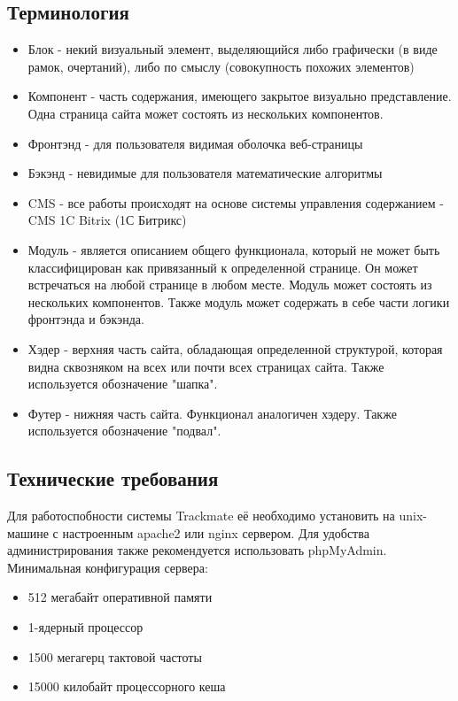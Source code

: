 \documentclass[DIV=calc, paper=a4, fontsize=11pt]{scrartcl} %
\begin{document}
\subsection{Терминология}
        
        \begin{itemize}
        \item Блок - некий визуальный элемент, выделяющийся либо графически (в виде рамок, очертаний), либо по смыслу (совокупность похожих элементов)
        \item Компонент - часть содержания, имеющего закрытое визуально представление. Одна страница сайта может состоять из нескольких компонентов.
        \item Фронтэнд - для пользователя видимая оболочка веб-страницы
        \item Бэкэнд - невидимые для пользователя математические алгоритмы
        \item CMS - все работы происходят на основе системы управления содержанием - CMS 1C Bitrix (1С Битрикс)
        \item Модуль - является описанием общего функционала, который не может быть классифицирован как привязанный к определенной странице. Он может встречаться на любой странице в любом месте. Модуль может состоять из нескольких компонентов. Также модуль может содержать в себе части логики фронтэнда и бэкэнда.
        \item Хэдер - верхняя часть сайта, обладающая определенной структурой, которая видна сквозняком на всех или почти всех страницах сайта. Также используется обозначение "шапка".
        \item Футер - нижняя часть сайта. Функционал аналогичен хэдеру. Также используется обозначение "подвал".
    \end{itemize}
    
\subsection{Технические требования}
Для работоспобности системы Trackmate её необходимо установить на unix-машине с настроенным apache2 или nginx сервером.
Для удобства администрирования также рекомендуется использовать phpMyAdmin.
\\[0.5cm]
Минимальная конфигурация сервера:
\begin{itemize}
	\item 512 мегабайт оперативной памяти
	\item 1-ядерный процессор
	\item 1500 мегагерц тактовой частоты
	\item 15000 килобайт процессорного кеша
\end{itemize}
\end{document}
